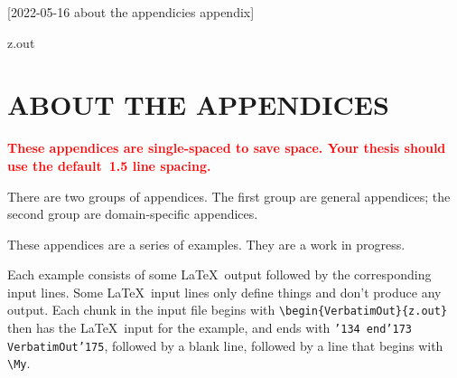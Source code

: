 [2022-05-16 about the appendicies appendix]

\begin{VerbatimOut}{z.out}
\chapter{ABOUT THE APPENDICES}


\textcolor{red}{%
  \textbf{%
    These appendices are single-spaced to save space.
    Your thesis should use the default~1.5 line spacing.%
  }%
}

There are two groups of appendices.
The first group are general appendices;
the second group are domain-specific appendices.

These appendices are a series of examples.
They are a work in progress.

Each example consists of some \LaTeX\ output
followed by the corresponding input lines.
Some \LaTeX\ input lines only define things
and don't produce any output.
Each chunk in the input file begins with
\verb+\begin{VerbatimOut}{z.out}+
then has the \LaTeX\ input for the example,
and ends with {\tt \char'134 end\char'173 VerbatimOut\char'175},
followed by a blank line,
followed by a line that begins with
\verb+\My+.

\end{VerbatimOut}

\MyIO



